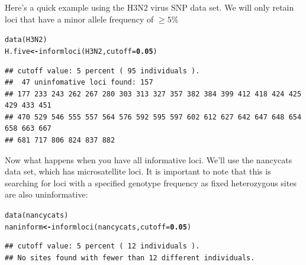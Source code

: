 \documentclass[letterpaper]{article}\usepackage[]{graphicx}\usepackage[]{color}
\makeatletter
\newcommand{\hlnum}[1]{\textcolor[rgb]{0.502,0,0.502}{\textbf{#1}}}%
\newcommand{\hlstd}[1]{\textcolor[rgb]{0,0,0}{#1}}%
\newcommand{\hlkwb}[1]{\textcolor[rgb]{0.502,0.502,0.753}{\textbf{#1}}}%
\newcommand{\hlkwc}[1]{\textcolor[rgb]{0,0.502,0.753}{#1}}%
\newcommand{\hlkwd}[1]{\textcolor[rgb]{0,0.267,0.4}{#1}}%
\newenvironment{kframe}{%
 \def\at@end@of@kframe{}%
 \ifinner\ifhmode%
  \def\at@end@of@kframe{\end{minipage}}%
  \begin{minipage}{\columnwidth}%
 \fi\fi%
 \def\FrameCommand##1{\hskip\@totalleftmargin \hskip-\fboxsep
 \colorbox{shadecolor}{##1}\hskip-\fboxsep
     \hskip-\linewidth \hskip-\@totalleftmargin \hskip\columnwidth}%
 \MakeFramed {\advance\hsize-\width
   \@totalleftmargin\z@ \linewidth\hsize
   \@setminipage}}%
 {\par\unskip\endMakeFramed%
 \at@end@of@kframe}
\newenvironment{knitrout}{}{} %
\makeatother
\begin{document}
Here's a quick example using the H3N2 virus SNP data set. We will only retain loci that have a minor allele frequency of $\geq 5\%$
\begin{knitrout}\footnotesize
{}\color{fgcolor}\begin{kframe}
\begin{alltt}
\hlkwd{data}\hlstd{(H3N2)}
\hlstd{H.five} \hlkwb{<-} \hlkwd{informloci}\hlstd{(H3N2,} \hlkwc{cutoff} \hlstd{=} \hlnum{0.05}\hlstd{)}
\end{alltt}
\end{kframe}
\end{knitrout}

\begin{knitrout}\footnotesize
{}\color{fgcolor}\begin{kframe}
\begin{verbatim}
## cutoff value: 5 percent ( 95 individuals ).
##  47 uninfomative loci found: 157 
## 177 233 243 262 267 280 303 313 327 357 382 384 399 412 418 424 425 429 433 451 
## 470 529 546 555 557 564 576 592 595 597 602 612 627 642 647 648 654 658 663 667 
## 681 717 806 824 837 882
\end{verbatim}
\end{kframe}
\end{knitrout}

Now what happens when you have all informative loci. We'll use the nancycats
data set, which has microsatellite loci. It is important to note that this is
searching for loci with a specified genotype frequency as fixed heterozygous sites are also uninformative:
\begin{knitrout}\footnotesize
{}\color{fgcolor}\begin{kframe}
\begin{alltt}
\hlkwd{data}\hlstd{(nancycats)}
\hlstd{naninform} \hlkwb{<-} \hlkwd{informloci}\hlstd{(nancycats,} \hlkwc{cutoff} \hlstd{=} \hlnum{0.05}\hlstd{)}
\end{alltt}
\begin{verbatim}
## cutoff value: 5 percent ( 12 individuals ).
## No sites found with fewer than 12 different individuals.
\end{verbatim}
\end{kframe}
\end{knitrout}


%
%
%
\end{document}

